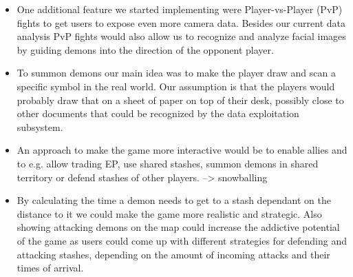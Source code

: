\begin{itemize}
    \item One additional feature we started implementing were Player-vs-Player (PvP) fights to get users to expose even more camera data.
    Besides our current data analysis PvP fights would also allow us to recognize and analyze facial images by guiding demons into the direction of the opponent player.
    \item To summon demons our main idea was to make the player draw and scan a specific symbol in the real world.
    Our assumption is that the players would probably draw that on a sheet of paper on top of their desk, possibly close to other documents that could be recognized by the data exploitation subsystem.
    \item An approach to make the game more interactive would be to enable allies and to e.g. allow trading EP, use shared stashes, summon demons in shared territory or defend stashes of other players.
    --> snowballing
    \item By calculating the time a demon needs to get to a stash dependant on the distance to it we could make the game more realistic and strategic. 
    Also showing attacking demons on the map could increase the addictive potential of the game as users could come up with different strategies for defending and attacking stashes, depending on the amount of incoming attacks and their times of arrival.
\end{itemize}





